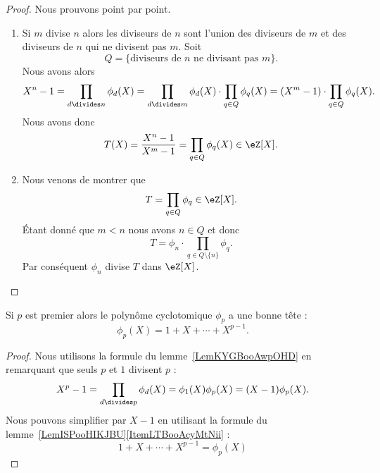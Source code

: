 \begin{proof}
    Nous prouvons point par point.
    \begin{enumerate}
        \item
            Si \( m\) divise \( n\) alors les diviseurs de \( n\) sont l'union des diviseurs de \( m\) et des diviseurs de \( n\) qui ne divisent pas \( m\). Soit
            \begin{equation}
                Q=\{\text{diviseurs de } n\text{ ne divisant pas } m \}.
            \end{equation}
            Nous avons alors
            \begin{equation}
                X^n-1=\prod_{d\divides n}\phi_d(X)=\prod_{d\divides m}\phi_d(X)\cdot\prod_{q\in Q}\phi_q(X)=(X^m-1)\cdot\prod_{q\in Q}\phi_q(X).
            \end{equation}
            Nous avons donc
            \begin{equation}
                T(X)=\frac{ X^n-1 }{ X^m-1 }=\prod_{q\in Q}\phi_q(X)\in \eZ[X].
            \end{equation}

        \item

            Nous venons de montrer que
            \begin{equation}
                T=\prod_{q\in Q}\phi_q\in \eZ[X].
            \end{equation}
            Étant donné que \( m<n\) nous avons \( n\in Q\) et donc
            \begin{equation}
                T=\phi_n\cdot\prod_{q\in Q\setminus\{ n \}}\phi_q.
            \end{equation}
            Par conséquent \( \phi_n\) divise \( T\) dans \( \eZ[X]\).
        \end{enumerate}
\end{proof}

\begin{corollary}   \label{CorTVUooErJiAC}
    Si \( p\) est premier alors le polynôme cyclotomique \( \phi_p\) a une bonne tête :
    \begin{equation}
        \phi_p(X)=1+X+\cdots +X^{p-1}.
    \end{equation}
\end{corollary}

\begin{proof}
    Nous utilisons la formule du lemme~\ref{LemKYGBooAwpOHD} en remarquant que seuls \( p\) et \( 1\) divisent \( p\) :
    \begin{equation}
        X^p-1=\prod_{d\divides p}\phi_d(X)=\phi_1(X)\phi_p(X)=(X-1)\phi_p(X).
    \end{equation}
    Nous pouvons simplifier par \( X-1\) en utilisant la formule du lemme~\ref{LemISPooHIKJBU}\ref{ItemLTBooAcyMtNii} :
    \begin{equation}
        1+X+\cdots +X^{p-1}=\phi_p(X)
    \end{equation}
\end{proof}


